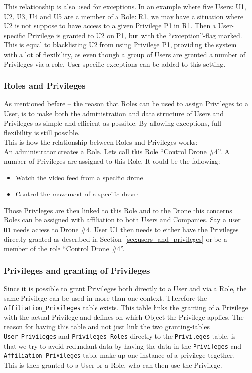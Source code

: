 This relationship is also used for exceptions.
In an example where five Users: U1, U2, U3, U4 and U5 are a member of a Role: R1, we may have a situation where U2 is not suppose to have access to a given Privilege P1 in R1.
Then a User-specific Privilege is granted to U2 on P1, but with the ``exception''-flag marked.
This is equal to blacklisting U2 from using Privilege P1, providing the system with a lot of flexibility, as even though a group of Users are granted a number of Privileges via a role, User-specific exceptions can be added to this setting. \\


\subsubsection*{Roles and Privileges}
As mentioned before -- the reason that Roles can be used to assign Privileges to a User, is to make both the administration and data structure of Users and Privileges as simple and efficient as possible.
By allowing exceptions, full flexibility is still possible. \\

This is how the relationship between Roles and Privileges works: \\

An administrator creates a Role.
Lets call this Role ``Control Drone \#4''.
A number of Privileges are assigned to this Role.
It could be the following:

\begin{itemize}
    \item Watch the video feed from a specific drone
    \item Control the movement of a specific drone
\end{itemize}

Those Privileges are then linked to this Role and to the Drone this concerns. \\

Roles can be assigned with affiliation to both Users and Companies.
Say a user \verb+U1+ needs access to Drone \#4.
User U1 then needs to either have the Privileges directly granted as described in Section~\ref{sec:users_and_privileges} or be a member of the role ``Control Drone \#4''.


\subsubsection*{Privileges and granting of Privileges}
Since it is possible to grant Privileges both directly to a User and via a Role, the same Privilege can be used in more than one context.
Therefore the \verb+Affiliation_Privileges+ table exists.
This table links the granting of a Privilege with the actual Privilege and defines on which Object the Privilege applies.
The reason for having this table and not just link the two granting-tables \verb+User_Privileges+ and \verb+Privileges_Roles+ directly to the \verb+Privileges+ table, is that we try to avoid redundant data by having the data in the \verb+Privileges+ and \verb+Affiliation_Privileges+ table make up one instance of a privilege together.
This is then granted to a User or a Role, who can then use the Privilege. \\

